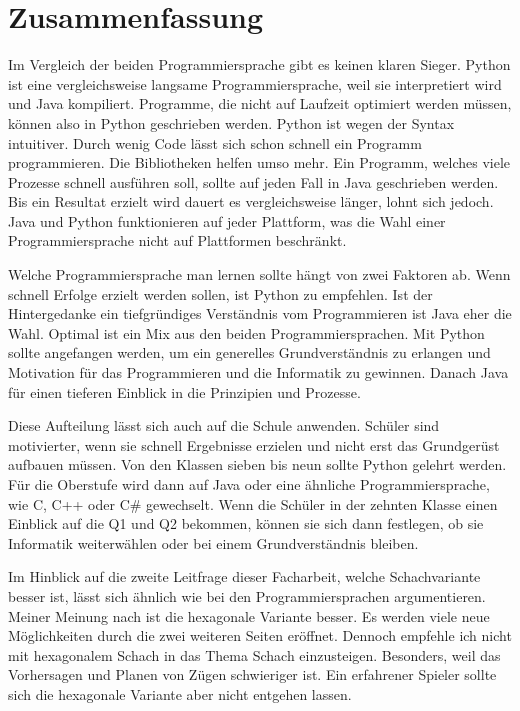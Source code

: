 \chapter{Zusammenfassung}

Im Vergleich der beiden Programmiersprache gibt es keinen klaren Sieger. Python ist eine vergleichsweise langsame Programmiersprache, weil sie interpretiert wird und Java kompiliert. Programme, die nicht auf Laufzeit optimiert werden müssen, können also in Python geschrieben werden. Python ist wegen der Syntax intuitiver. Durch wenig Code lässt sich schon schnell ein Programm programmieren. Die Bibliotheken helfen umso mehr. Ein Programm, welches viele Prozesse schnell ausführen soll, sollte auf jeden Fall in Java geschrieben werden. Bis ein Resultat erzielt wird dauert es vergleichsweise länger, lohnt sich jedoch. Java und Python funktionieren auf jeder Plattform, was die Wahl einer Programmiersprache nicht auf Plattformen beschränkt.\par
Welche Programmiersprache man lernen sollte hängt von zwei Faktoren ab. Wenn schnell Erfolge erzielt werden sollen, ist Python zu empfehlen. Ist der Hintergedanke ein tiefgründiges Verständnis vom Programmieren ist Java eher die Wahl. Optimal ist ein Mix aus den beiden Programmiersprachen. Mit Python sollte angefangen werden, um ein generelles Grundverständnis zu erlangen und Motivation für das Programmieren und die Informatik zu gewinnen. Danach Java für einen tieferen Einblick in die Prinzipien und Prozesse.\par
Diese Aufteilung lässt sich auch auf die Schule anwenden. Schüler sind motivierter, wenn sie schnell Ergebnisse erzielen und nicht erst das Grundgerüst aufbauen müssen. Von den Klassen sieben bis neun sollte Python gelehrt werden. Für die Oberstufe wird dann auf Java oder eine ähnliche Programmiersprache, wie C, C++ oder C\# gewechselt. Wenn die Schüler in der zehnten Klasse einen Einblick auf die Q1 und Q2 bekommen, können sie sich dann festlegen, ob sie Informatik weiterwählen oder bei einem Grundverständnis bleiben.
\par
Im Hinblick auf die zweite Leitfrage dieser Facharbeit, welche Schachvariante besser ist, lässt sich ähnlich wie bei den Programmiersprachen argumentieren. Meiner Meinung nach ist die hexagonale Variante besser. Es werden viele neue Möglichkeiten durch die zwei weiteren Seiten eröffnet. Dennoch empfehle ich nicht mit hexagonalem Schach in das Thema Schach einzusteigen. Besonders, weil das Vorhersagen und Planen von Zügen schwieriger ist. Ein erfahrener Spieler sollte sich die hexagonale Variante aber nicht entgehen lassen.
